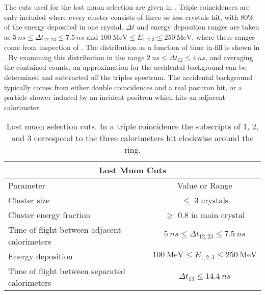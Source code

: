 The cuts used for the lost muon selection are given in . Triple coincidences are only included where every cluster consists of three or less crystals hit, with 80\% of the energy deposited in one crystal. $\Delta t$ and energy deposition ranges are taken as $\SI{5}{ns} \leq \Delta t_{12, 23} \leq \SI{7.5}{ns}$ and $\SI{100}{\MeV} \leq E_{1,2,3} \leq \SI{250}{\MeV}$, where these ranges come from inspection of . The \DT distribution as a function of time in-fill is shown in . By examining this distribution in the range $\SI{2}{ns} \leq \Delta t_{12} \leq \SI{4}{ns}$, and averaging the contained counts, an approximation for the accidental background can be determined and subtracted off the triples spectrum. The accidental background typically comes from either double coincidences and a real positron hit, or a particle shower induced by an incident positron which hits an adjacent calorimeter. 

\begin{table}[h]
\centering
\setlength\tabcolsep{10pt}
\renewcommand{\arraystretch}{1.2}
\begin{tabular*}{1\linewidth}{@{\extracolsep{\fill}}lc}
  \hline
    \multicolumn{2}{c}{\textbf{Lost Muon Cuts}} \\
  \hline\hline
    Parameter & Value or Range \\
  \hline
    Cluster size & $\leq$ 3 crystals \\
    Cluster energy fraction & $\geq$ 0.8 in main crystal \\
    Time of flight between adjacent calorimeters & $\SI{5}{ns} \leq \Delta t_{12, 23} \leq \SI{7.5}{ns}$ \\
    Energy deposition & $\SI{100}{\MeV} \leq E_{1,2,3} \leq \SI{250}{\MeV}$ \\
    Time of flight between separated calorimeters & $\Delta t_{13} \leq \SI{14.4}{ns}$ \\
  \hline 
\end{tabular*}
\caption[Lost muon cuts]{Lost muon selection cuts. In a triple coincidence the subscripts of 1, 2, and 3 correspond to the three calorimeters hit clockwise around the ring.}
\label{tab:lostmuoncuts}
\end{table}


